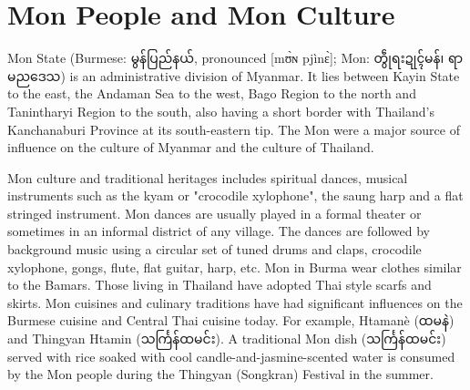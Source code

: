 \documentclass[conference]{IEEEtran}
\begin{document}
\section{Mon People and Mon Culture}
Mon State (Burmese: {\padauktext မွန်ပြည်နယ်}, pronounced [mʊ̀ɴ pjìnɛ̀]; Mon: {\padauktext တွဵုရးဍုၚ်မန်၊ ရာမညဒေသ}) is an administrative division of Myanmar. It lies between Kayin State to the east, the Andaman Sea to the west, Bago Region to the north and Tanintharyi Region to the south, also having a short border with Thailand's Kanchanaburi Province at its south-eastern tip. The Mon were a major source of influence on the culture of Myanmar and the culture of Thailand.\\
\par Mon culture and traditional heritages includes spiritual dances, musical instruments such as the kyam or "crocodile xylophone", the saung harp and a flat stringed instrument. Mon dances are usually played in a formal theater or sometimes in an informal district of any village. The dances are followed by background music using a circular set of tuned drums and claps, crocodile xylophone, gongs, flute, flat guitar, harp, etc. Mon in Burma wear clothes similar to the Bamars. Those living in Thailand have adopted Thai style scarfs and skirts. Mon cuisines and culinary traditions have had significant influences on the Burmese cuisine and Central Thai cuisine today. For example, Htamanè ({\padauktext ထမနဲ}) and Thingyan Htamin ({\padauktext သင်္ကြန်ထမင်း}). A traditional Mon dish ({\padauktext သင်္ကြန်ထမင်း}) served with rice soaked with cool candle-and-jasmine-scented water is consumed by the Mon people during the Thingyan (Songkran) Festival in the summer.
\end{document}
